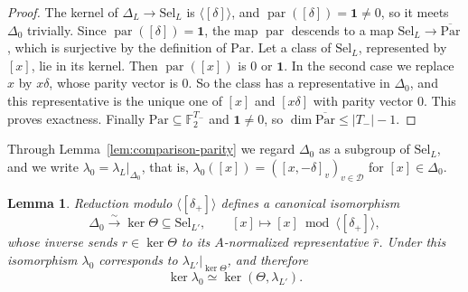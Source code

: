 \documentclass[11pt]{article}
\theoremstyle{plain}
\newtheorem{lemma}[theorem]{Lemma}
\theoremstyle{definition}
\theoremstyle{remark}
\newcommand{\F}{\mathbb F}
\begin{document}
\begin{proof}
The kernel of $\Delta_L\to\mathrm{Sel}_L$ is $\langle[\delta]\rangle$, and
$\operatorname{par}([\delta])=\mathbf1\ne0$, so it meets $\Delta_0$
trivially.  Since $\operatorname{par}([\delta])=\mathbf1$, the map
$\operatorname{par}$ descends to a map $\mathrm{Sel}_L\to
\overline{\mathrm{Par}}$, which is surjective by the definition of
$\mathrm{Par}$.  Let a class of $\mathrm{Sel}_L$, represented by $[x]$, lie
in its kernel.  Then $\operatorname{par}([x])$ is $0$ or $\mathbf1$.  In
the second case we replace $x$ by $x\delta$, whose parity vector is $0$.
So the class has a representative in $\Delta_0$, and this representative
is the unique one of $[x]$ and $[x\delta]$ with parity vector $0$.  This
proves exactness.  Finally $\mathrm{Par}\subseteq\F_2^{T_-}$ and
$\mathbf1\ne0$, so $\dim\overline{\mathrm{Par}}\le|T_-|-1$.
\end{proof}

Through Lemma~\ref{lem:comparison-parity} we regard $\Delta_0$ as a
subgroup of $\mathrm{Sel}_L$, and we write
$\lambda_0=\lambda_L|_{\Delta_0}$, that is,
$\lambda_0([x])=([x,-\delta]_v)_{v\in\mathcal D}$ for $[x]\in\Delta_0$.

\begin{lemma}\label{lem:comparison-zero}
Reduction modulo $\langle[\delta_+]\rangle$ defines a canonical isomorphism
\begin{equation}\label{eq:zero-pattern-comparison}
 \Delta_0\xrightarrow{\ \sim\ }\ker\Theta\subseteq \mathrm{Sel}_{L'},
 \qquad [x]\longmapsto[x]\bmod\langle[\delta_+]\rangle,
\end{equation}
whose inverse sends $r\in\ker\Theta$ to its $A$-normalized representative
$\hat r$.  Under this isomorphism $\lambda_0$ corresponds to
$\lambda_{L'}|_{\ker\Theta}$, and therefore
\begin{equation}\label{eq:comparison-zero-kernel}
 \ker\lambda_0\simeq\ker(\Theta,\lambda_{L'}).
\end{equation}
\end{lemma}
\end{document}
